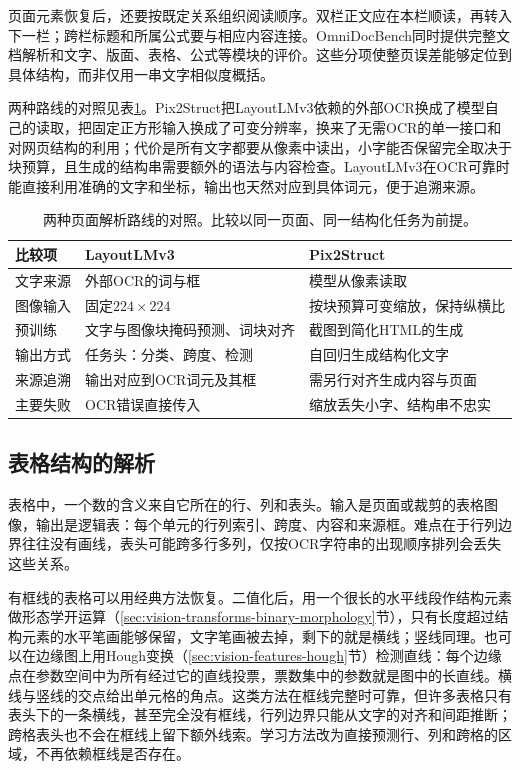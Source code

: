 页面元素恢复后，还要按既定关系组织阅读顺序。双栏正文应在本栏顺读，再转入下一栏；跨栏标题和所属公式要与相应内容连接。OmniDocBench同时提供完整文档解析和文字、版面、表格、公式等模块的评价。这些分项使整页误差能够定位到具体结构，而非仅用一串文字相似度概括。

两种路线的对照见表\ref{tab:vision-understanding-page-compare}。Pix2Struct把LayoutLMv3依赖的外部OCR换成了模型自己的读取，把固定正方形输入换成了可变分辨率，换来了无需OCR的单一接口和对网页结构的利用；代价是所有文字都要从像素中读出，小字能否保留完全取决于块预算，且生成的结构串需要额外的语法与内容检查。LayoutLMv3在OCR可靠时能直接利用准确的文字和坐标，输出也天然对应到具体词元，便于追溯来源。

\begin{table}[htbp]
  \centering
  \small
  \begin{tabularx}{\linewidth}{@{}p{14mm}XX@{}}
    \toprule
    比较项 & LayoutLMv3 & Pix2Struct\\
    \midrule
    文字来源 & 外部OCR的词与框 & 模型从像素读取\\
    图像输入 & 固定$224\times224$ & 按块预算可变缩放，保持纵横比\\
    预训练 & 文字与图像块掩码预测、词块对齐 & 截图到简化HTML的生成\\
    输出方式 & 任务头：分类、跨度、检测 & 自回归生成结构化文字\\
    来源追溯 & 输出对应到OCR词元及其框 & 需另行对齐生成内容与页面\\
    主要失败 & OCR错误直接传入 & 缩放丢失小字、结构串不忠实\\
    \bottomrule
  \end{tabularx}
  \caption{两种页面解析路线的对照。比较以同一页面、同一结构化任务为前提。}
  \label{tab:vision-understanding-page-compare}
\end{table}

\subsection{表格结构的解析}
\label{sec:vision-understanding-tables}
\label{sec:vision-understanding-pubtables}

表格中，一个数的含义来自它所在的行、列和表头。输入是页面或裁剪的表格图像，输出是逻辑表：每个单元的行列索引、跨度、内容和来源框。难点在于行列边界往往没有画线，表头可能跨多行多列，仅按OCR字符串的出现顺序排列会丢失这些关系。

有框线的表格可以用经典方法恢复。二值化后，用一个很长的水平线段作结构元素做形态学开运算（\ref{sec:vision-transforms-binary-morphology}节），只有长度超过结构元素的水平笔画能够保留，文字笔画被去掉，剩下的就是横线；竖线同理。也可以在边缘图上用Hough变换（\ref{sec:vision-features-hough}节）检测直线：每个边缘点在参数空间中为所有经过它的直线投票，票数集中的参数就是图中的长直线。横线与竖线的交点给出单元格的角点。这类方法在框线完整时可靠，但许多表格只有表头下的一条横线，甚至完全没有框线，行列边界只能从文字的对齐和间距推断；跨格表头也不会在框线上留下额外线索。学习方法改为直接预测行、列和跨格的区域，不再依赖框线是否存在。

